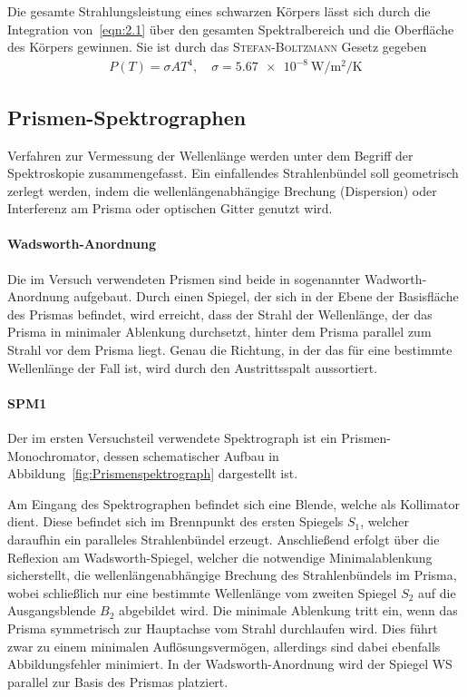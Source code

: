 \documentclass[a4paper,twoside,final]{article}
\begin{document}
Die gesamte Strahlungsleistung eines schwarzen Körpers lässt sich durch die Integration von~\eqref{eqn:2.1} über den gesamten Spektralbereich und die Oberfläche des Körpers gewinnen. Sie ist durch das \textsc{Stefan-Boltzmann} Gesetz gegeben
\begin{align}
  P(T) = \sigma A T^4, \quad \sigma = \SI[per-mode=fraction]{5.67e-8}{\watt\per\metre\squared\per\kelvin}
\end{align}

\subsection{Prismen-Spektrographen}
Verfahren zur Vermessung der Wellenlänge werden unter dem Begriff der Spektroskopie zusammengefasst. Ein einfallendes Strahlenbündel soll geometrisch zerlegt werden, indem die wellenlängenabhängige Brechung (Dispersion) oder Interferenz am Prisma oder optischen Gitter genutzt wird.
\paragraph{Wadsworth-Anordnung} Die im Versuch verwendeten Prismen sind beide in sogenannter Wadworth-Anordnung aufgebaut. Durch einen Spiegel, der sich in der Ebene der Basisfläche des Prismas befindet, wird erreicht, dass der Strahl der Wellenlänge, der das Prisma in minimaler Ablenkung durchsetzt, hinter dem Prisma parallel zum Strahl vor dem Prisma liegt. Genau die Richtung, in der das für eine bestimmte Wellenlänge der Fall ist, wird durch den Austrittsspalt aussortiert.

\paragraph{SPM1} Der im ersten Versuchsteil verwendete Spektrograph ist ein Prismen-Monochromator, dessen schematischer Aufbau in Abbildung~\ref{fig:Prismenspektrograph} dargestellt ist.



Am Eingang des Spektrographen befindet sich eine Blende, welche als Kollimator dient. Diese befindet sich im Brennpunkt des ersten Spiegels $S_1$, welcher daraufhin ein paralleles Strahlenbündel erzeugt. Anschließend erfolgt über die Reflexion am Wadsworth-Spiegel, welcher die notwendige Minimalablenkung sicherstellt, die wellenlängenabhängige Brechung des Strahlenbündels im Prisma, wobei schließlich nur eine bestimmte Wellenlänge vom zweiten Spiegel $S_2$ auf die Ausgangsblende $B_2$ abgebildet wird. Die minimale Ablenkung tritt ein, wenn das Prisma symmetrisch zur Hauptachse vom Strahl durchlaufen wird. Dies führt zwar zu einem minimalen Auflösungsvermögen, allerdings sind dabei ebenfalls Abbildungsfehler minimiert. In der Wadsworth-Anordnung wird der Spiegel WS parallel zur Basis des Prismas platziert.
\end{document}
